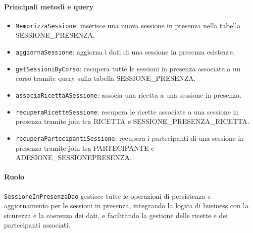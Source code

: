 \paragraph{Principali metodi e query}
\begin{itemize}
    \item \texttt{MemorizzaSessione}: inserisce una nuova sessione in presenza nella tabella SESSIONE\_PRESENZA.
    \item \texttt{aggiornaSessione}: aggiorna i dati di una sessione in presenza esistente.
    \item \texttt{getSessioniByCorso}: recupera tutte le sessioni in presenza associate a un corso tramite query sulla tabella SESSIONE\_PRESENZA.
    \item \texttt{associaRicettaASessione}: associa una ricetta a una sessione in presenza.
    \item \texttt{recuperaRicetteSessione}: recupera le ricette associate a una sessione in presenza tramite join tra RICETTA e SESSIONE\_PRESENZA\_RICETTA.
    \item \texttt{recuperaPartecipantiSessione}: recupera i partecipanti di una sessione in presenza tramite join tra PARTECIPANTE e ADESIONE\_SESSIONEPRESENZA.
\end{itemize}

\paragraph{Ruolo}
\texttt{SessioneInPresenzaDao} gestisce tutte le operazioni di persistenza e aggiornamento per le sessioni in presenza, integrando la logica di business con la sicurezza e la coerenza dei dati, e facilitando la gestione delle ricette e dei partecipanti associati.

